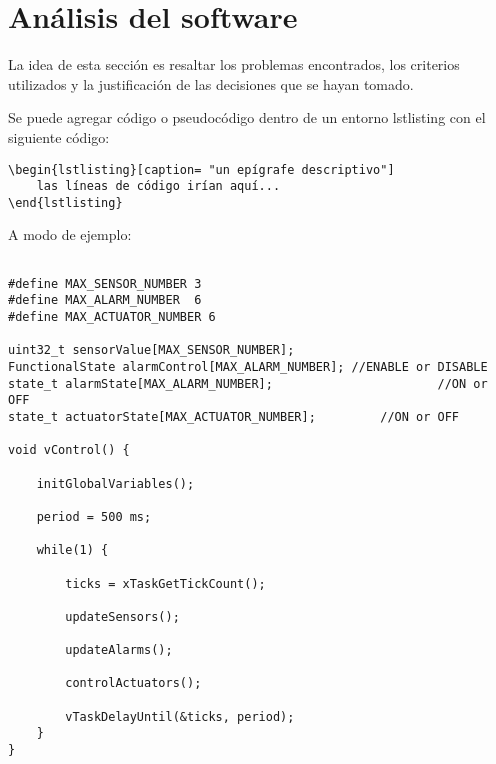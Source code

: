 \section{Análisis del software}

La idea de esta sección es resaltar los problemas encontrados, los criterios
utilizados y la justificación de las decisiones que se hayan tomado.

Se puede agregar código o pseudocódigo dentro de un entorno lstlisting con el
siguiente código:

\begin{verbatim}
\begin{lstlisting}[caption= "un epígrafe descriptivo"]
	las líneas de código irían aquí...
\end{lstlisting}
\end{verbatim}

A modo de ejemplo:

\begin{lstlisting}[label=cod:vControl,caption=Pseudocódigo del lazo principal de control.]  % Start your code-block

#define MAX_SENSOR_NUMBER 3
#define MAX_ALARM_NUMBER  6
#define MAX_ACTUATOR_NUMBER 6

uint32_t sensorValue[MAX_SENSOR_NUMBER];		
FunctionalState alarmControl[MAX_ALARM_NUMBER];	//ENABLE or DISABLE
state_t alarmState[MAX_ALARM_NUMBER];						//ON or OFF
state_t actuatorState[MAX_ACTUATOR_NUMBER];			//ON or OFF

void vControl() {

	initGlobalVariables();
	
	period = 500 ms;
		
	while(1) {

		ticks = xTaskGetTickCount();
		
		updateSensors();
		
		updateAlarms();
		
		controlActuators();
		
		vTaskDelayUntil(&ticks, period);
	}
}
\end{lstlisting}

